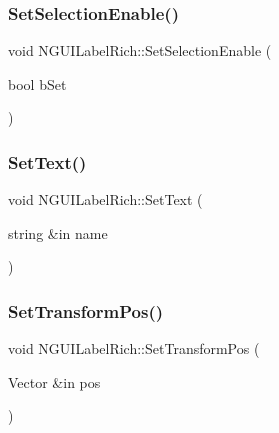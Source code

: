 \hypertarget{class_n_g_u_i_label_rich_a835d47c9f63c3d393a81c8526bd43f87}{}\label{class_n_g_u_i_label_rich_a835d47c9f63c3d393a81c8526bd43f87} 
\subsubsection{\texorpdfstring{Set\+Selection\+Enable()}{SetSelectionEnable()}}
{\footnotesize\ttfamily void N\+G\+U\+I\+Label\+Rich\+::\+Set\+Selection\+Enable (\begin{DoxyParamCaption}\item[{bool}]{b\+Set }\end{DoxyParamCaption})}

\hypertarget{class_n_g_u_i_label_rich_a53c28af7720137b21a31746acc436688}{}\label{class_n_g_u_i_label_rich_a53c28af7720137b21a31746acc436688} 
\subsubsection{\texorpdfstring{Set\+Text()}{SetText()}}
{\footnotesize\ttfamily void N\+G\+U\+I\+Label\+Rich\+::\+Set\+Text (\begin{DoxyParamCaption}\item[{string \&in}]{name }\end{DoxyParamCaption})}

\hypertarget{class_n_g_u_i_label_rich_ad51487221f208651c7d5faa9cc212d8d}{}\label{class_n_g_u_i_label_rich_ad51487221f208651c7d5faa9cc212d8d} 
\subsubsection{\texorpdfstring{Set\+Transform\+Pos()}{SetTransformPos()}}
{\footnotesize\ttfamily void N\+G\+U\+I\+Label\+Rich\+::\+Set\+Transform\+Pos (\begin{DoxyParamCaption}\item[{Vector \&in}]{pos }\end{DoxyParamCaption})}

